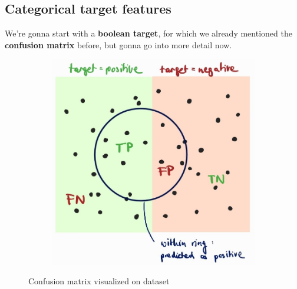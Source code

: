\subsection{Categorical target features}

We're gonna start with a \textbf{boolean target}, for which we already mentioned the \textbf{confusion matrix} before, but gonna go into more detail now.

\begin{figure}[H]
  \centering
  \begin{subfigure}{0.4\textwidth}
    \centering
    \includegraphics[width=\textwidth]{assets/sl/ct__confusion.jpg}
  \end{subfigure}

  \caption{Confusion matrix visualized on dataset}
  \label{fig:7_confusion_matrix}
\end{figure}

